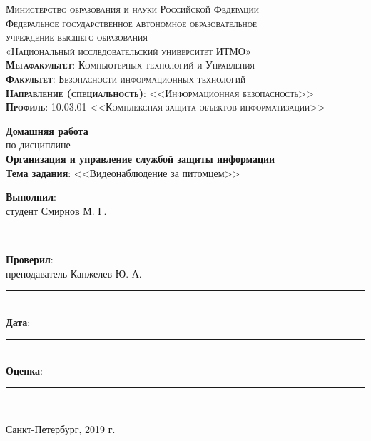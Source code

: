 \begin{titlepage}
	\begin{center}
		\textsc{
			\fontsize{12pt}{14pt}\selectfont
			Министерство образования и науки Российской Федерации\\
			Федеральное государственное автономное образовательное\\
			учреждение высшего образования\\
			«Национальный исследовательский университет ИТМО»\\
			\textbf{Мегафакультет}:  Компьютерных технологий и Управления\\
			\textbf{Факультет}: Безопасности информационных технологий\\
			\textbf{Направление (специальность)}: <<Информационная безопасность>>\\
			\textbf{Профиль}: 10.03.01 <<Комплексная защита объектов информатизации>>}
		
		\vfill
		
		\textbf{Домашняя работа}\\
		по дисциплине\\
		\textbf{Организация и управление службой защиты информации}\\
	\vfill
	\textbf{Тема задания}: <<Видеонаблюдение за питомцем>>\\
	\end{center}

	\vfill
	
	\begin{flushright}
	\textbf{Выполнил}:\\ студент Смирнов М. Г. \rule{5em}{.1pt}\\
	\textbf{Проверил}:\\ преподаватель Канжелев Ю. А.\rule{5em}{.1pt}\\
		\vfill
	\textbf{Дата}: \rule{10em}{.1pt}\\
	\textbf{Оценка}: \rule{10em}{.1pt}\\

	\vfill
	


	\end{flushright}
	\vfill
	\begin{center}
		Санкт-Петербург, 2019 г.
	\end{center}
\end{titlepage}